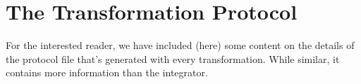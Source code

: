 \newpage
\section{The Transformation Protocol}
\genHeader

For the interested reader, we have included (here) some content on the details of the protocol file that's generated with every transformation. While similar,
it contains more information than the integrator.
